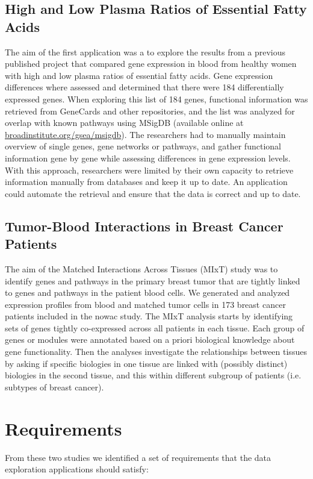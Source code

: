 \subsection{High and Low Plasma Ratios of Essential Fatty Acids} 
The aim of the first application was a to explore the results from a previous
published project that compared gene expression in blood from healthy women with
high and low plasma ratios of essential fatty acids.\cite{olsen2013plasma}  Gene
expression differences where assessed and determined that there were 184
differentially expressed genes. When exploring this list of 184 genes,
functional information was retrieved from GeneCards and other repositories, and
the list was analyzed for overlap with known pathways using MSigDB (available
online at
\href{broadinstitute.org/gsea/msigdb}{broadinstitute.org/gsea/msigdb}). The
researchers had to manually maintain overview of single genes, gene networks or
pathways, and gather functional information gene by gene while assessing
differences in gene expression levels. With this approach, researchers were
limited by their own capacity to retrieve information manually from databases
and keep it up to date. An application could automate the retrieval and ensure
that the data is correct and up to date. 

\subsection{Tumor-Blood Interactions in Breast Cancer Patients}
The aim of the Matched Interactions Across Tissues (MIxT) study was to identify
genes and pathways in the primary breast tumor that are tightly linked to genes
and pathways in the patient blood cells.\cite{dumeaux2017interactions} We
generated and analyzed expression profiles from blood and matched tumor cells in
173 breast cancer patients included in the \gls{nowac} 
study.  The MIxT analysis starts by identifying sets of genes tightly
co-expressed across all patients in each tissue. Each group of genes or modules
were annotated based on a priori biological knowledge about gene functionality.
Then the analyses investigate the relationships between tissues by asking if
specific biologies in one tissue are linked with (possibly distinct) biologies
in the second tissue, and this within different subgroup of patients (i.e.
subtypes of breast cancer).

\section{Requirements} 
From these two studies we identified a set of requirements that the data
exploration applications should satisfy: 

